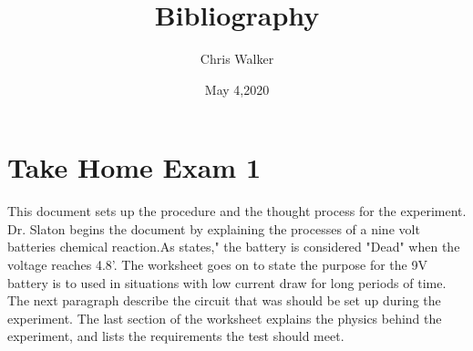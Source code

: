 \documentclass[12pt]{article}
\title{Bibliography}
\author{Chris Walker}
\date{May 4,2020}
\begin{document}
\section{Take Home Exam 1}
This document sets up the procedure and the thought process for the experiment.  
Dr. Slaton begins the document by explaining the processes of a nine volt batteries chemical reaction.As \cite{take_home} states," the battery is considered "Dead" when the voltage reaches 4.8'. The worksheet goes on to state the purpose for the 9V battery is to used in situations with low current draw for long periods of time. The next paragraph describe the circuit that was should be set up during the experiment. The last section of the worksheet explains the physics behind the experiment, and lists the requirements the test should meet. 



\printbibliography
\end{document}
